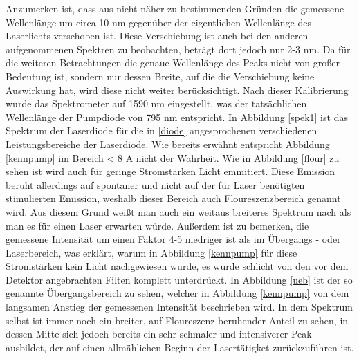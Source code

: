 Anzumerken ist, dass aus nicht näher zu bestimmenden Gründen die gemessene Wellenlänge um circa 10 nm gegenüber der eigentlichen Wellenlänge des Laserlichts verschoben ist. Diese Verschiebung ist auch bei den anderen aufgenommenen Spektren zu beobachten, beträgt dort jedoch nur 2-3 nm. Da für die weiteren Betrachtungen die genaue Wellenlänge des Peaks nicht von großer Bedeutung ist, sondern nur dessen Breite, auf die die Verschiebung keine Auswirkung hat, wird diese nicht weiter berücksichtigt.\newline
Nach dieser Kalibrierung wurde das Spektrometer auf 1590 nm eingestellt, was der tatsächlichen Wellenlänge der Pumpdiode von 795 nm entspricht. \newline
In Abbildung \ref{spek1} ist das Spektrum der Laserdiode für die in \ref{diode} angesprochenen verschiedenen Leistungsbereiche der Laserdiode. Wie bereits erwähnt entspricht Abbildung \ref{kennpump} im Bereich \newline < 8 A nicht der Wahrheit. Wie in Abbildung \ref{flour} zu sehen ist wird auch für geringe Stromstärken Licht emmitiert. Diese Emission beruht allerdings auf spontaner und nicht auf der für Laser benötigten stimulierten Emission, weshalb dieser Bereich auch Floureszenzbereich genannt wird. Aus diesem Grund weißt man auch ein weitaus breiteres Spektrum nach als man es für einen Laser erwarten würde. Außerdem ist zu bemerken, die gemessene Intensität um einen Faktor 4-5 niedriger ist als im Übergangs - oder Laserbereich, was erklärt, warum in Abbildung \ref{kennpump} für diese Stromstärken kein Licht nachgewiesen wurde, es wurde schlicht von den vor dem Detektor angebrachten Filten komplett unterdrückt. \newline 
In Abbildung \ref{ueb} ist der so genannte Übergangsbereich zu sehen, welcher in Abbildung \ref{kennpump} von dem langsamen Anstieg der gemessenen Intensität beschrieben wird. In dem Spektrum selbst ist immer noch ein breiter, auf Floureszenz beruhender Anteil zu sehen, in dessen Mitte sich jedoch bereits ein sehr schmaler und intensiverer Peak ausbildet, der auf einen allmählichen Beginn der Lasertätigket zurückzuführen ist.
